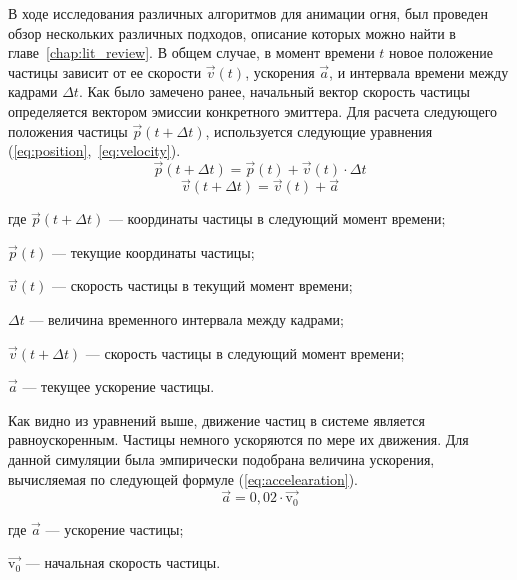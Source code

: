 В ходе исследования различных алгоритмов для анимации огня, был проведен обзор
нескольких различных подходов, описание которых можно найти в
главе~\ref{chap:lit_review}. В общем случае, в момент времени $t$ новое
положение частицы зависит от ее скорости $\vec{v}(t)$, ускорения $\vec{a}$, и интервала
времени между кадрами $\Delta t$. Как было замечено ранее, начальный вектор
скорость частицы определяется вектором эмиссии конкретного эмиттера. Для расчета
следующего положения частицы $\vec{p}(t + \Delta{t})$, используется следующие
уравнения (\ref{eq:position},~\ref{eq:velocity}).
\begin{equation}
  \label{eq:position}
  \vec{p}(t + \Delta{t}) = \vec{p}(t) + \vec{v}(t) \cdot \Delta{t}
\end{equation}
\vspace{-1em}
\begin{equation}
  \label{eq:velocity}
  \vec{v}(t + \Delta{t}) = \vec{v}(t) + \vec{a}
\end{equation}
\begin{explanationx}
    \item [где] $\vec{p}(t + \Delta{t})$ --- координаты частицы в следующий
        момент времени;
    \item $\vec{p}(t)$ --- текущие координаты частицы;
    \item $\vec{v}(t)$ --- скорость частицы в текущий момент времени;
    \item $\Delta{t}$ --- величина временного интервала между кадрами;
    \item $\vec{v}(t + \Delta{t})$ --- скорость частицы в следующий момент времени;
    \item $\vec{a}$ --- текущее ускорение частицы.
\end{explanationx}

Как видно из уравнений выше, движение частиц в системе является равноускоренным.
Частицы немного ускоряются по мере их движения. Для данной симуляции была
эмпирически подобрана величина ускорения, вычисляемая по следующей формуле
(\ref{eq:accelearation}).
\begin{equation}
  \label{eq:accelearation}
  \vec{a} = 0,02 \cdot \vec{\text{v}_\text{0}}
\end{equation}
\begin{explanationx}
    \item [где] $\vec{a}$ --- ускорение частицы;
    \item $\vec{\text{v}_\text{0}}$ --- начальная скорость частицы.
\end{explanationx}

